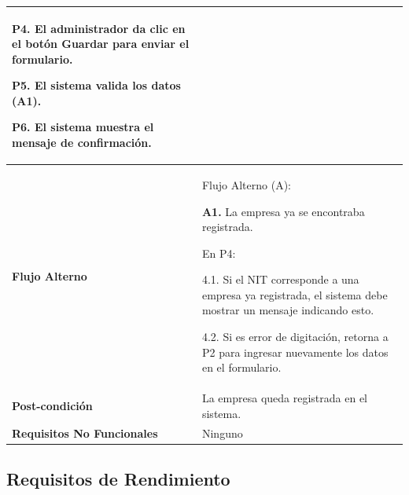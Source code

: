 \documentclass[12pt,a4paper]{article}
\begin{document}
\begin{center}
\begin{tabular}{|p{5.5cm}| p{9.5cm}|}
\textbf{P4.} El administrador da clic en el botón Guardar para enviar el formulario.

\textbf{P5.} El sistema valida los datos (A1).

\textbf{P6.} El sistema muestra el mensaje de confirmación.
\\
\hline 
\textbf{Flujo Alterno} &  Flujo Alterno (A):

\textbf{A1.} La empresa ya se encontraba registrada.

	En P4:
	
	4.1. Si el NIT corresponde a una empresa ya registrada, el sistema debe mostrar un mensaje indicando esto.
	
	4.2. Si es error de digitación, retorna a P2 para ingresar nuevamente los datos en el formulario. \\ 
\hline 
\textbf{Post-condición}  & La empresa queda registrada en el sistema. \\ 
\hline 
\textbf{Requisitos No Funcionales} & Ninguno \\ 
\hline 
\end{tabular}
\end{center}
\subsection{Requisitos de Rendimiento}
\end{document}
